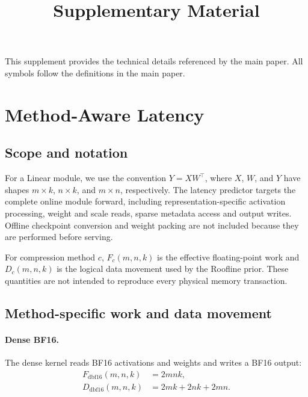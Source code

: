 \documentclass[letterpaper]{article} %
\title{Supplementary Material}
\numberwithin{equation}{section}
\numberwithin{table}{section}
\begin{document}
\maketitle
\appendix

This supplement provides the technical details referenced by the main paper. All symbols follow the definitions in the main paper.

\section{Method-Aware Latency}
\label{app:latency-prior}

\subsection{Scope and notation}

For a Linear module, we use the convention \(Y=XW^\top\), where \(X\),
\(W\), and \(Y\) have shapes \(m\times k\), \(n\times k\), and \(m\times n\),
respectively. The latency predictor targets the complete online module
forward, including representation-specific activation processing, weight and
scale reads, sparse metadata access and output writes. Offline
checkpoint conversion and weight packing are not included because they are
performed before serving.

For compression method \(c\), \(F_c(m,n,k)\) is the effective floating-point
work and \(D_c(m,n,k)\) is the logical data movement used by the Roofline
prior. These quantities are not intended to reproduce every physical memory
transaction.

\subsection{Method-specific work and data movement}

\paragraph{Dense BF16.}
The dense kernel reads BF16 activations and weights and writes a BF16 output:
\begin{equation}
\begin{aligned}
F_{\mathrm{dbf16}}(m,n,k) &= 2mnk,\\
D_{\mathrm{dbf16}}(m,n,k) &= 2mk+2nk+2mn.
\end{aligned}
\end{equation}
\end{document}
